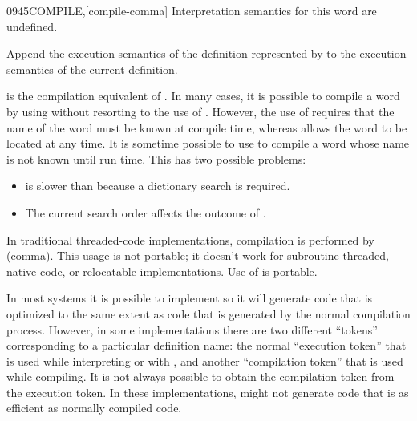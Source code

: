 \begin{worddef}{0945}{COMPILE,}[compile-comma]
\interpret
	Interpretation semantics for this word are undefined.

\execute

	Append the execution semantics of the definition represented
	by  to the execution semantics of the current
	definition.

	\begin{defer}
	\rationale %
		 is the compilation equivalent of
		. In many cases, it is possible to compile a
		word by using  without resorting to the use of
		. However, the use of  requires
		that the name of the word must be known at compile time,
		whereas  allows the word to be located at any
		time. It is sometime possible to use  to compile
		a word whose name is not known until run time. This has two
		possible problems:
		\begin{itemize}
		\item {} is slower than  because a
			dictionary search is required.
		\item The current search order affects the outcome of
			.
		\end{itemize}
		In traditional threaded-code implementations, compilation is
		performed by \word{,} (comma). This usage is not portable; it
		doesn't work for subroutine-threaded, native code, or
		relocatable implementations. Use of  is portable.

		In most systems it is possible to implement  so
		it will generate code that is optimized to the same extent as
		code that is generated by the normal compilation process.
		However, in some implementations there are two different
		``tokens'' corresponding to a particular definition name:
		the normal ``execution token'' that is used while interpreting
		or with , and another ``compilation token'' that
		is used while compiling. It is not always possible to obtain
		the compilation token from the execution token. In these
		implementations,  might not generate code that
		is as efficient as normally compiled code.
	\end{defer}
\end{worddef}


